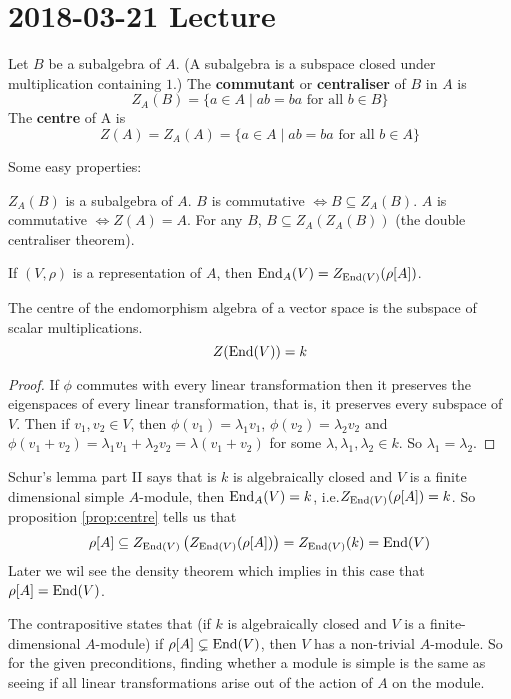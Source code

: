 \section{2018-03-21 Lecture}

\begin{defn}
	Let $B$ be a subalgebra of $A$.
	(A subalgebra is a subspace closed under multiplication containing $1$.)
	The \textbf{commutant} or \textbf{centraliser} of $B$ in $A$ is
	\[Z_A(B) = \{a \in A \mid ab=ba \text{ for all } b \in B\}\]
	The \textbf{centre} of A is
	\[Z(A) = Z_A(A) = \{a \in A \mid ab=ba \text{ for all } b \in A\}\]
\end{defn}

\begin{prop}\label{prop:centre}
	Some easy properties:
	\begin{itm}
		\io $Z_A(B)$ is a subalgebra of $A$.
		\io $B$ is commutative $\iff B \subseteq Z_A(B)$.
		\io $A$ is commutative $\iff Z(A)=A$.
		\io For any $B$, $B \subseteq Z_A(Z_A(B))$ (the double centraliser theorem).
	\end{itm}
\end{prop}

\begin{exam}
	If $(V,\rho)$ is a representation of $A$, then $\operatorname{End}_A(V) = Z_{\operatorname{End}(V)}(\rho[A])$.
\end{exam}

\begin{lem}
	The centre of the endomorphism algebra of a vector space is the subspace of scalar multiplications.
	\[Z(\operatorname{End}(V))=k\]
\end{lem}

\begin{proof}
	If $\phi$ commutes with every linear transformation then it preserves the eigenspaces of every linear transformation, that is, it preserves every subspace of $V$.
	Then if $v_1,v_2 \in V$, then $\phi(v_1)=\lambda_1v_1$, $\phi(v_2)=\lambda_2v_2$ and $\phi(v_1+v_2)=\lambda_1v_1+\lambda_2v_2 = \lambda(v_1+v_2)$ for some $\lambda,\lambda_1,\lambda_2 \in k$.
	So $\lambda_1=\lambda_2$.
\end{proof}

\begin{note}
	Schur's lemma part II says that is $k$ is algebraically closed and $V$ is a finite dimensional simple $A$-module, then $\operatorname{End}_A(V)=k$, i.e.\@ $Z_{\operatorname{End}(V)}(\rho[A])=k$.
	So proposition \ref{prop:centre} tells us that
	\[\rho[A] \subseteq Z_{\operatorname{End}(V)}\left(Z_{\operatorname{End}(V)}(\rho[A])\right) = Z_{\operatorname{End}(V)}(k) = \operatorname{End}(V)\]
	Later we wil see the density theorem which implies in this case that $\rho[A]=\operatorname{End}(V)$.
	
	The contrapositive states that (if $k$ is algebraically closed and $V$ is a finite-dimensional $A$-module) if $\rho[A] \subsetneq \operatorname{End}(V)$, then $V$ has a non-trivial $A$-module.
	So for the given preconditions, finding whether a module is simple is the same as seeing if all linear transformations arise out of the action of $A$ on the module.
\end{note}

